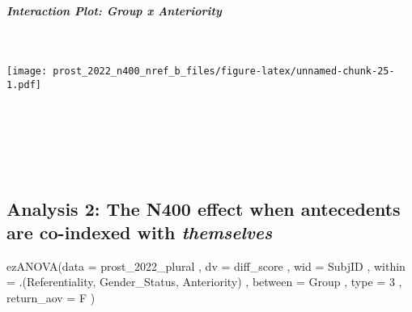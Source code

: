 \documentclass[
]{article}
\newenvironment{Shaded}{\begin{snugshade}}{\end{snugshade}}
\newcommand{\AttributeTok}[1]{\textcolor[rgb]{0.77,0.63,0.00}{#1}}
\newcommand{\DecValTok}[1]{\textcolor[rgb]{0.00,0.00,0.81}{#1}}
\newcommand{\FunctionTok}[1]{\textcolor[rgb]{0.00,0.00,0.00}{#1}}
\newcommand{\NormalTok}[1]{#1}
\begin{document}
\hypertarget{interaction-plot-group-x-anteriority}{%
\subparagraph{Interaction Plot: Group x
Anteriority}\label{interaction-plot-group-x-anteriority}}

~

\texttt{[image: prost\_2022\_n400\_nref\_b\_files/figure-latex/unnamed-chunk-25-1.pdf]}

~

~

~

\hypertarget{analysis-2-the-n400-effect-when-antecedents-are-co-indexed-with-themselves}{%
\subsection{\texorpdfstring{Analysis 2: The N400 effect when antecedents
are co-indexed with
\emph{themselves}}{Analysis 2: The N400 effect when antecedents are co-indexed with themselves}}\label{analysis-2-the-n400-effect-when-antecedents-are-co-indexed-with-themselves}}

\begin{Shaded}
\begin{Highlighting}[]
\FunctionTok{ezANOVA}\NormalTok{(}\AttributeTok{data =}\NormalTok{ prost\_2022\_plural}
\NormalTok{              , }\AttributeTok{dv =}\NormalTok{ diff\_score}
\NormalTok{              , }\AttributeTok{wid =}\NormalTok{ SubjID}
\NormalTok{              , }\AttributeTok{within =}\NormalTok{ .(Referentiality, Gender\_Status, Anteriority)}
\NormalTok{              , }\AttributeTok{between =}\NormalTok{ Group}
\NormalTok{              , }\AttributeTok{type =} \DecValTok{3}
\NormalTok{              , }\AttributeTok{return\_aov =}\NormalTok{ F}
\NormalTok{              )}
\end{Highlighting}
\end{Shaded}
\end{document}
